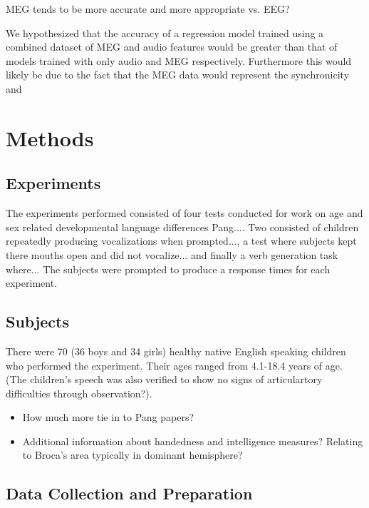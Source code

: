 \documentclass[a4paper]{article}
\begin{document}
MEG tends to be more accurate and more appropriate vs. EEG?

We hypothesized that the accuracy of a regression model trained using a combined dataset of MEG and audio features would be greater than that of models trained with only audio and MEG respectively. Furthermore this would likely be due to the fact that the MEG data would represent the synchronicity and 

\section{Methods}


\subsection{Experiments}

The experiments performed consisted of four tests conducted for work on age and sex related developmental language differences {Pang...}. Two consisted of children repeatedly producing vocalizations when prompted..., a test where subjects kept there mouths open and did not vocalize... and finally a verb generation task where... The subjects were prompted to produce a response  times for each experiment.

\subsection{Subjects}

There were 70 (36 boys and 34 girls) healthy native English speaking children who performed the experiment. Their ages ranged from 4.1-18.4 years of age. (The children's speech was also verified to show no signs of articulartory difficulties through observation?).

\begin{itemize}
\item How much more tie in to Pang papers?
\item Additional information about handedness and intelligence measures? Relating to Broca's area typically in dominant hemisphere?
\end{itemize}

\subsection{Data Collection and Preparation}
\end{document}
